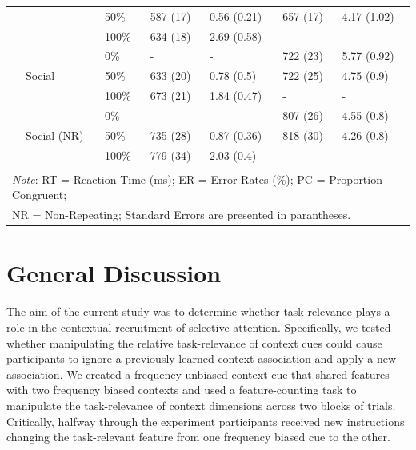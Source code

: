 \documentclass[english,,man,floatsintext]{apa6}
\begin{document}
\begin{table}[htbp]
\begin{tabular}{lllcccc}
& & \multicolumn{1}{l}{50\%} & \multicolumn{1}{l}{587 (17)} & \multicolumn{1}{l}{0.56 (0.21)} & \multicolumn{1}{l}{657 (17)} & \multicolumn{1}{l}{4.17 (1.02)} \\
& & \multicolumn{1}{l}{100\%} & \multicolumn{1}{l}{634 (18)} & \multicolumn{1}{l}{2.69 (0.58)} & \multicolumn{1}{l}{-} & \multicolumn{1}{l}{-} \\
\cmidrule(rl){2-7}
& \multirow{3}{*}{Social} & \multicolumn{1}{l}{0\%} & \multicolumn{1}{l}{-} & \multicolumn{1}{l}{-} & \multicolumn{1}{l}{722 (23)} & \multicolumn{1}{l}{5.77 (0.92)} \\
& & \multicolumn{1}{l}{50\%} & \multicolumn{1}{l}{633 (20)} & \multicolumn{1}{l}{0.78 (0.5)} & \multicolumn{1}{l}{722 (25)} & \multicolumn{1}{l}{4.75 (0.9)} \\
& & \multicolumn{1}{l}{100\%} & \multicolumn{1}{l}{673 (21)} & \multicolumn{1}{l}{1.84 (0.47)} & \multicolumn{1}{l}{-} & \multicolumn{1}{l}{-} \\
\cmidrule(rl){2-7}
& \multirow{3}{*}{Social (NR)} & \multicolumn{1}{l}{0\%} & \multicolumn{1}{l}{-} & \multicolumn{1}{l}{-} & \multicolumn{1}{l}{807 (26)} & \multicolumn{1}{l}{4.55 (0.8)} \\
& & \multicolumn{1}{l}{50\%} & \multicolumn{1}{l}{735 (28)} & \multicolumn{1}{l}{0.87 (0.36)} & \multicolumn{1}{l}{818 (30)} & \multicolumn{1}{l}{4.26 (0.8)} \\
& & \multicolumn{1}{l}{100\%} & \multicolumn{1}{l}{779 (34)} & \multicolumn{1}{l}{2.03 (0.4)} & \multicolumn{1}{l}{-} & \multicolumn{1}{l}{-} \\
 & & & & & & \\
\bottomrule
\multicolumn{7}{l}{\textit{Note}: RT = Reaction Time (ms);  ER = Error Rates (\%); PC = Proportion Congruent;} \\
\multicolumn{7}{l}{NR = Non-Repeating; Standard Errors are presented in parantheses.} \\
\end{tabular}%
\end{table}

\section{General Discussion}\label{general-discussion}

The aim of the current study was to determine whether task-relevance
plays a role in the contextual recruitment of selective attention.
Specifically, we tested whether manipulating the relative task-relevance
of context cues could cause participants to ignore a previously learned
context-association and apply a new association. We created a frequency
unbiased context cue that shared features with two frequency biased
contexts and used a feature-counting task to manipulate the
task-relevance of context dimensions across two blocks of trials.
Critically, halfway through the experiment participants received new
instructions changing the task-relevant feature from one frequency
biased cue to the other.
\end{document}
